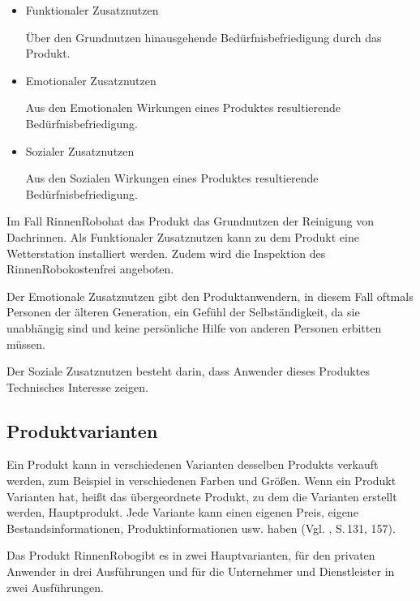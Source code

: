             \begin{itemize}
                \item Funktionaler Zusatznutzen
                
                    Über den Grundnutzen hinausgehende Bedürfnisbefriedigung durch das Produkt.

                \item Emotionaler Zusatznutzen
                
                    Aus den Emotionalen Wirkungen eines Produktes resultierende Bedürfnisbefriedigung.

                \item Sozialer Zusatznutzen
                
                    Aus den Sozialen Wirkungen eines Produktes resultierende Bedürfnisbefriedigung.
            \end{itemize}

        Im Fall \as RinnenRobo\adl hat das Produkt das Grundnutzen der Reinigung von Dachrinnen. Als Funktionaler
        Zusatznutzen kann zu dem Produkt eine Wetterstation installiert werden. Zudem wird die Inspektion des
        \as RinnenRobo\adl kostenfrei angeboten. 
            
        Der Emotionale Zusatznutzen gibt den Produktanwendern, in diesem Fall oftmals Personen der älteren Generation,
        ein Gefühl der Selbständigkeit, da sie unabhängig sind und keine persönliche Hilfe von anderen Personen erbitten
        müssen. 
        
        Der Soziale Zusatznutzen besteht darin, dass Anwender dieses Produktes Technisches Interesse zeigen. 
            
    \subsection{Produktvarianten}
        Ein Produkt kann in verschiedenen Varianten desselben Produkts verkauft werden, zum Beispiel in verschiedenen
        Farben und Größen. Wenn ein Produkt Varianten hat, heißt das übergeordnete Produkt, zu dem die Varianten
        erstellt werden, Hauptprodukt. Jede Variante kann einen eigenen Preis, eigene Bestandsinformationen,
        Produktinformationen usw. haben (Vgl. \cite{Bruhn2012}, S.\,131, 157).
        
        Das Produkt \as RinnenRobo\adl gibt es in zwei Hauptvarianten, für den privaten Anwender in drei Ausführungen
        und für die Unternehmer und Dienstleister in zwei Ausführungen.
            
